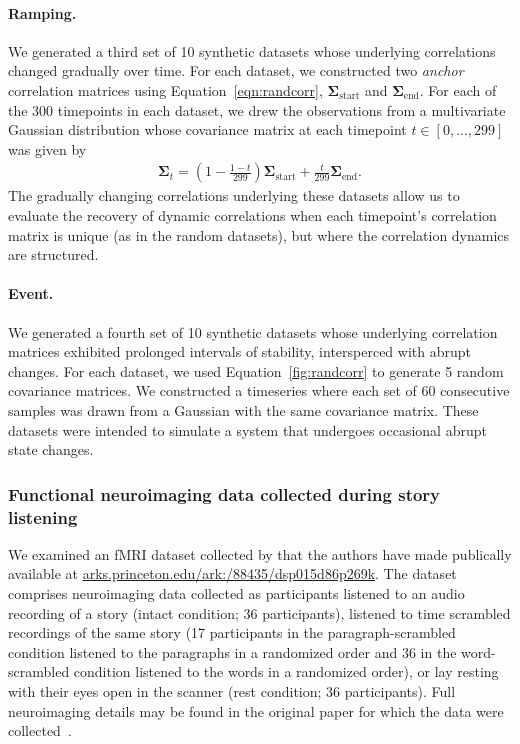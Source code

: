 \documentclass[english]{article}
\begin{document}
  \paragraph*{Ramping.}  We generated a third set of 10 synthetic
  datasets whose underlying correlations changed gradually over time.
  For each dataset, we constructed two \textit{anchor} correlation
  matrices using Equation~\ref{eqn:randcorr},
  $\mathbf{\Sigma}_{\mathrm{start}}$ and
  $\mathbf{\Sigma}_{\mathrm{end}}$.  For each of the 300 timepoints in
  each dataset, we drew the observations from a multivariate Gaussian
  distribution whose covariance matrix at each timepoint $t \in
  \left[0, ..., 299\right]$ was given by
  \begin{align}
    \mathbf{\Sigma}_t = \left( 1 - \frac{1 - t}{299} \right)
    \mathbf{\Sigma}_{\mathrm{start}} + \frac{t}{299}\mathbf{\Sigma}_{\mathrm{end}}.
  \end{align}
The gradually changing correlations underlying these datasets allow us
to evaluate the recovery of dynamic correlations when each timepoint's
correlation matrix is unique (as in the random datasets), but where
the correlation dynamics are structured.
  
\paragraph*{Event.} We generated a fourth set of 10 synthetic datasets
whose underlying correlation matrices exhibited prolonged intervals of
stability, intersperced with abrupt changes.  For each dataset, we
used Equation~\ref{fig:randcorr} to generate 5 random covariance
matrices.  We constructed a timeseries where each set of 60 consecutive samples
was drawn from a Gaussian with the same covariance matrix.  These
datasets were intended to simulate a system that undergoes occasional
abrupt state changes.

\subsubsection*{Functional neuroimaging data collected during story
  listening}
We examined an fMRI dataset collected by \cite{SimoEtal16} that the
authors have made publically available at
\href{http://arks.princeton.edu/ark:/88435/dsp015d86p269k}{arks.princeton.edu/ark:/88435/dsp015d86p269k}.  The dataset
comprises neuroimaging data collected as participants listened
to an audio recording of a story (intact condition; 36 participants),
listened to time scrambled recordings of the same story (17
participants in the paragraph-scrambled condition listened to the
paragraphs in a randomized order and 36 in the word-scrambled
condition listened to the words in a randomized order), or lay resting
with their eyes open in the scanner (rest condition; 36
participants).  Full neuroimaging details may be found in the original
paper for which the data were collected~\citep{SimoEtal16}.
\end{document}
